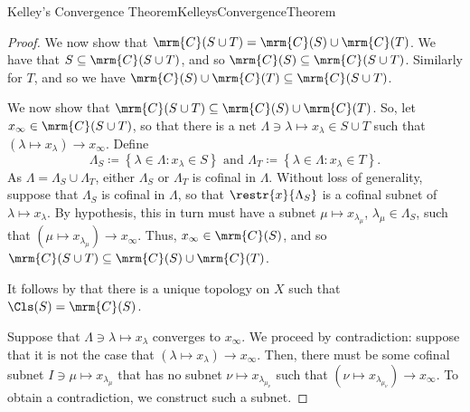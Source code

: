 \begin{thm}{Kelley's Convergence Theorem}{KelleysConvergenceTheorem}
\begin{proof}
We now show that $\mrm{C}(S\cup T)=\mrm{C}(S)\cup \mrm{C}(T)$.  We have that $S\subseteq \mrm{C}(S\cup T)$, and so $\mrm{C}(S)\subseteq \mrm{C}(S\cup T)$.  Similarly for $T$, and so we have $\mrm{C}(S)\cup \mrm{C}(T)\subseteq \mrm{C}(S\cup T)$.

We now show that $\mrm{C}(S\cup T)\subseteq \mrm{C}(S)\cup \mrm{C}(T)$.  So, let $x_\infty \in \mrm{C}(S\cup T)$, so that there is a net $\Lambda \ni \lambda \mapsto x_\lambda \in S\cup T$ such that $(\lambda \mapsto x_\lambda )\to x_\infty$.  Define
\begin{equation*}
\Lambda _S\coloneqq \left\{ \lambda \in \Lambda :x_\lambda \in S\right\} \text{ and }\Lambda _T\coloneqq \left\{ \lambda \in \Lambda :x_\lambda \in T\right\} .
\end{equation*}
As $\Lambda =\Lambda _S\cup \Lambda _T$, either $\Lambda _S$ or $\Lambda _T$ is cofinal in $\Lambda$.  Without loss of generality, suppose that $\Lambda _S$ is cofinal in $\Lambda$, so that $\restr{x}{\Lambda _S}$ is a cofinal subnet of $\lambda \mapsto x_\lambda$.  By hypothesis, this in turn must have a subnet $\mu \mapsto x_{\lambda _\mu}$, $\lambda _\mu \in \Lambda _S$, such that $(\mu \mapsto x_{\lambda _\mu})\to x_\infty$.  Thus, $x_\infty \in \mrm{C}(S)$, and so $\mrm{C}(S\cup T)\subseteq \mrm{C}(S)\cup \mrm{C}(T)$.

It follows by  that there is a unique topology on $X$ such that $\Cls (S)=\mrm{C}(S)$.

Suppose that $\Lambda \ni \lambda \mapsto x_\lambda$ converges to $x_\infty$.  We proceed by contradiction:  suppose that it is not the case that $(\lambda \mapsto x_\lambda )\to x_\infty$.  Then, there must be some cofinal subnet $I\ni \mu \mapsto x_{\lambda _\mu}$ that has no subnet $\nu \mapsto x_{\lambda _{\mu _\nu}}$ such that $(\nu \mapsto x_{\lambda _{\mu _\nu}})\to x_\infty$.  To obtain a contradiction, we construct such a subnet.


\end{proof}
\end{thm}
